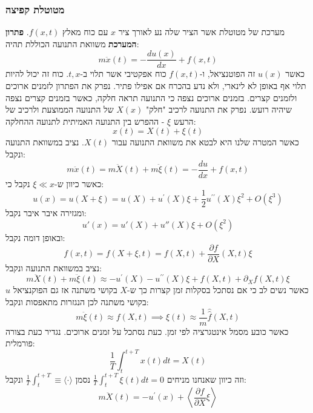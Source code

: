 \documentclass{tstextbook}
\begin{document}
\subsubsection{מטוטלת קפיצה}

מערכת של מטוטלת אשר הציר שלה נע לאורך ציר \(x\) עם כוח מאלץ \(f(x,t)\).
\textbf{פתרון המערכת}
משוואת התנועה הכוללת תהיה:
$$m{\ddot{x}}\left(t\right)=-{\frac{d u\left(x\right)}{d x}}+f\left(x,t\right)$$
כאשר \(u(x)\) זה הפוטנציאל, ו-\(f(x,t)\) כוח אפקטיבי אשר תלוי ב-\(t,x\). כוח זה יכול להיות תלוי אף באופן לא לינארי, ולא נדע בהכרח אם אפילו פתיר. נפרק את הפתרון לזמנים ארוכים ולזמנים קצרים. בזמנים ארוכים נצפה כי התנועה תראה חלקה, כאשר בזמנים קצרים נצפה שיהיה רועש. נפרק את התנועה לרכיב "חלק" \(X(x)\) של התנועה הממוצעת ולרכיב של הרעש \(\xi\) - ההפרש בין התנועה האמיתית לתנועה ההחלקה:
$$x\left(t\right)=X\left(t\right)+\xi\left(t\right)$$
כאשר המטרה שלנו היא לבטא את משוואת התנועה עבור \(X(t)\).
נציב במשוואת התנועה ונקבל:
$$m{\ddot{x}}\left(t\right)=m{\ddot{X}}\left(t\right)+m{\ddot{\xi}}\left(t\right)=-{\frac{d u}{d x}}+f\left(x,t\right)$$
כאשר כיוון ש-\(\xi \ll x\) נקבל כי:
$$u\left(x\right)=u\left(X+\xi\right)=u\left(X\right)+u^{\prime}\left(X\right)\xi+\frac{1}{2}u^{\prime\prime}\left(X\right)\xi^{2}+O\left( \xi^3 \right)$$
ומגזירה איבר איבר נקבל:
$$u'(x)=u'(X)+u''(X)\xi+O\left( \xi^2 \right)$$
ובאופן דומה נקבל:
$$f\left(x,t\right)=f\left(X+\xi,t\right)=f\left(X,t\right)+{\frac{\partial f}{\partial X}}\left(X,t\right)\xi$$
נציב במשוואת התנועה ונקבל:
$$m{\ddot{X}}\left(t\right)+m{\ddot{\xi}}\left(t\right)\approx-u^{\prime}\left(X\right)-u^{\prime\prime}\left(X\right)\xi+f\left(X,t\right)+\partial_{X}f\left(X,t\right)\xi$$
כאשר נשים לב כי אם נסתכל בסקלות זמן קצרות כך ש-\(X\) בקושי משתנה אז גם הפוקנציאל \(u\) בקושי משתנה לכן הנגזרות מתאפסות ונקבל:
$$m{\ddot{\xi}}\left(t\right)\approx f\left(X,t\right)\implies \xi(t)\approx \frac{1}{m}\hat{\hat{f}}(X,t)$$
כאשר כובע מסמל אינטגרציה לפי זמן. כעת נסתכל על זמנים ארוכים. נגדיר כעת בצורה פורמלית:
$${\frac{1}{T}}\int_{t}^{t+T}x\left(t\right)d t=X\left(t\right)$$
וזה כיוון שאנחנו מניחים \(\textstyle{\frac{1}{T}}\int_{t}^{t+T}\xi\left(t\right)d t=0\) נסמן \(\frac{1}{T}\int_{t}^{t+T}\equiv\langle\cdot\rangle\) ונקבל:
$$m\ddot{X}\left(t\right)=-u^{\prime}\left(x\right)+\left\langle\frac{\partial f}{\partial X}\xi\right\rangle$$
\end{document}
